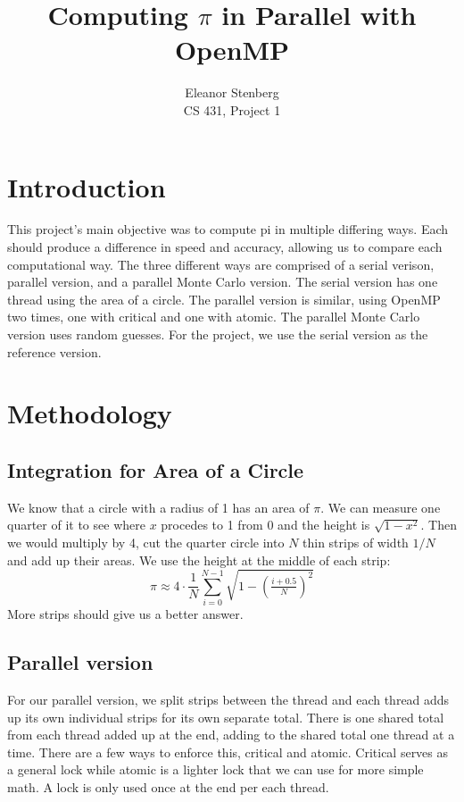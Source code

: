 \documentclass[11pt,twocolumn]{article}
\title{Computing $\pi$ in Parallel with OpenMP}
\author{Eleanor Stenberg \\ CS 431, Project 1}
\date{}
\begin{document}
\maketitle

\section{Introduction}
This project's main objective was to compute pi in multiple differing ways. Each should produce a difference in speed and accuracy, allowing us to compare each computational way. The three different ways are comprised of a serial verison, parallel version, and a parallel Monte Carlo version. The serial version has one thread using the area of a circle. The parallel version is similar, using OpenMP two times, one with critical and one with atomic. The parallel Monte Carlo version uses random guesses. For the project, we use the serial version as the reference version.
\section{Methodology}

\subsection{Integration for Area of a Circle}
We know that a circle with a radius of 1 has an area of $\pi$. We can measure one quarter of it to see where $x$ procedes to 1 from 0 and the height is $\sqrt{1-x^2}$. Then we would multiply by 4,  cut the quarter circle into $N$ thin strips of width
$1/N$ and add up their areas. We use the height at the middle of
each strip:
\begin{equation}
  \pi \approx 4 \cdot \frac{1}{N} \sum_{i=0}^{N-1}
  \sqrt{1 - \left(\tfrac{i+0.5}{N}\right)^2}
\end{equation}
More strips should give us a better answer.

\subsection{Parallel version}
For our parallel version, we split strips between the thread and each thread adds up its own individual strips for its own separate total. There is one shared total from each thread added up at the end, adding to the shared total one thread at a time. There are a few ways to enforce this, critical and atomic. Critical serves as a general lock while atomic is a lighter lock that we can use for more simple math. A lock is only used once at the end per each thread.
\end{document}
